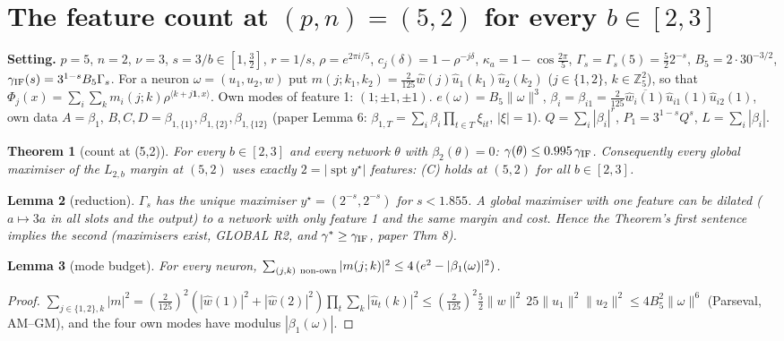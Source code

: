 \documentclass[11pt]{article}
\newtheorem{theorem}{Theorem}\newtheorem{lemma}[theorem]{Lemma}\newtheorem{corollary}[theorem]{Corollary}
\begin{document}
\section*{The feature count at $(p,n)=(5,2)$ for every $b\in[2,3]$}

\textbf{Setting.} $p=5$, $n=2$, $\nu=3$, $s=3/b\in[1,\tfrac32]$, $r=1/s$, $\rho=e^{2\pi i/5}$, $c_j(\delta)=1-\rho^{-j\delta}$,
$\kappa_a=1-\cos\frac{2\pi}5$, $\Gamma_s=\Gamma_s(5)=\tfrac52 2^{-s}$, $B_5=2\cdot30^{-3/2}$, $\gamma_{\rm IF}(s)=3^{1-s}B_5\Gamma_s$.
For a neuron $\omega=(u_1,u_2,w)$ put $m(j;k_1,k_2)=\tfrac2{125}\hat w(j)\hat u_1(k_1)\hat u_2(k_2)$ ($j\in\{1,2\}$, $k\in\mathbb Z_5^2$), so that
$\Phi_j(x)=\sum_i\sum_k m_i(j;k)\rho^{\langle k+j\mathbf 1,x\rangle}$.  Own modes of feature 1: $(1;\pm1,\pm1)$.  $e(\omega)=B_5\|\omega\|^3$,
$\beta_i=\beta_{i1}=\tfrac2{125}\overline{\hat w_i(1)}\hat u_{i1}(1)\hat u_{i2}(1)$, own data $A=\beta_1$, $B,C,D=\beta_{1,\{1\}},\beta_{1,\{2\}},\beta_{1,\{12\}}$
(paper Lemma 6: $\beta_{1,T}=\sum_i\beta_i\prod_{t\in T}\xi_{it}$, $|\xi|=1$).  $Q=\sum_i|\beta_i|^r$, $P_1=3^{1-s}Q^s$, $L=\sum_i|\beta_i|$.

\begin{theorem}[count at (5,2)]
For every $b\in[2,3]$ and every network $\theta$ with $\beta_2(\theta)=0$: $\gamma(\theta)\le 0.995\,\gamma_{\rm IF}$.  Consequently every
global maximiser of the $L_{2,b}$ margin at $(5,2)$ uses exactly $2=|\operatorname{spt}y^\star|$ features: (C) holds at $(5,2)$ for all $b\in[2,3]$.
\end{theorem}

\begin{lemma}[reduction]  $\Gamma_s$ has the unique maximiser $y^\star=(2^{-s},2^{-s})$ for $s<1.855$.  A global maximiser with one feature can be dilated
($a\mapsto 3a$ in all slots and the output) to a network with only feature 1 and the same margin and cost.  Hence the Theorem's first sentence implies the second
(maximisers exist, GLOBAL R2, and $\gamma^\ast\ge\gamma_{\rm IF}$, paper Thm 8).\end{lemma}

\begin{lemma}[mode budget]  For every neuron, $\sum_{(j,k)\ \rm non\text{-}own}|m(j;k)|^2\le 4\,(e^2-|\beta_1(\omega)|^2)$.\end{lemma}
\begin{proof} $\sum_{j\in\{1,2\},k}|m|^2=(\tfrac2{125})^2(|\hat w(1)|^2+|\hat w(2)|^2)\prod_t\sum_k|\hat u_t(k)|^2\le(\tfrac2{125})^2\tfrac52\|w\|^2\,25\|u_1\|^2\|u_2\|^2\le 4B_5^2\|\omega\|^6$
(Parseval, AM--GM), and the four own modes have modulus $|\beta_1(\omega)|$.\end{proof}
\end{document}
